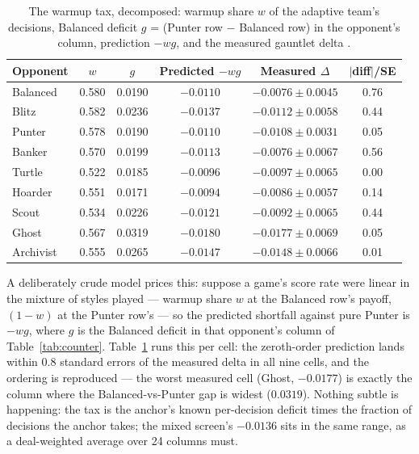 \documentclass[11pt]{article}
\begin{document}
\begin{table}[t]
\centering
\caption{The warmup tax, decomposed: warmup share $w$ of the adaptive team's decisions,
Balanced deficit $g$ = (Punter row $-$ Balanced row) in the opponent's column, prediction
$-w g$, and the measured gauntlet delta \cite{artifact}.}
\label{tab:tax}
\footnotesize
\begin{tabular}{@{}lccccc@{}}
\toprule
Opponent & $w$ & $g$ & Predicted $-w g$ & Measured $\Delta$ & $|$diff$|$/SE \\
\midrule
Balanced  & 0.580 & 0.0190 & $-0.0110$ & $-0.0076 \pm 0.0045$ & 0.76 \\
Blitz     & 0.582 & 0.0236 & $-0.0137$ & $-0.0112 \pm 0.0058$ & 0.44 \\
Punter    & 0.578 & 0.0190 & $-0.0110$ & $-0.0108 \pm 0.0031$ & 0.05 \\
Banker    & 0.570 & 0.0199 & $-0.0113$ & $-0.0076 \pm 0.0067$ & 0.56 \\
Turtle    & 0.522 & 0.0185 & $-0.0096$ & $-0.0097 \pm 0.0065$ & 0.00 \\
Hoarder   & 0.551 & 0.0171 & $-0.0094$ & $-0.0086 \pm 0.0057$ & 0.14 \\
Scout     & 0.534 & 0.0226 & $-0.0121$ & $-0.0092 \pm 0.0065$ & 0.44 \\
Ghost     & 0.567 & 0.0319 & $-0.0180$ & $-0.0177 \pm 0.0069$ & 0.05 \\
Archivist & 0.555 & 0.0265 & $-0.0147$ & $-0.0148 \pm 0.0066$ & 0.01 \\
\bottomrule
\end{tabular}
\end{table}

A deliberately crude model prices this: suppose a game's score rate were linear in the
mixture of styles played --- warmup share $w$ at the Balanced row's payoff, $(1-w)$ at
the Punter row's --- so the predicted shortfall against pure Punter is $-w g$, where $g$
is the Balanced deficit in that opponent's column of Table~\ref{tab:counter}. Table~\ref{tab:tax} runs this per cell: the zeroth-order
prediction lands within $0.8$ standard errors of the measured delta in all nine cells,
and the ordering is reproduced --- the worst measured cell (Ghost, $-0.0177$) is exactly
the column where the Balanced-vs-Punter gap is widest ($0.0319$). Nothing subtle is
happening: the tax is the anchor's known per-decision deficit times the fraction of
decisions the anchor takes; the mixed screen's $-0.0136$ sits in the same range, as a
deal-weighted average over 24 columns must.
\end{document}
